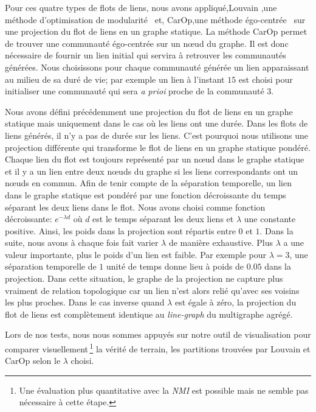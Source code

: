 \bigskip
Pour ces quatre types de flots de liens, nous avons appliqué,Louvain ,une méthode d'optimisation de modularité~\cite{Blondel2008a} et, CarOp,une méthode égo-centrée~\cite{Danisch2012} sur une projection du flot de liens en un graphe statique.
La méthode CarOp permet de trouver une communauté égo-centrée sur un n\oe ud du graphe.
Il est donc nécessaire de fournir un lien initial qui servira à retrouver les communautés générées.
Nous choisissons pour chaque communauté générée un lien apparaissant au milieu de sa duré de vie; par exemple un lien à l'instant $15$ est choisi pour initialiser une communauté qui sera \emph{a prioi} proche de la communauté $3$.


Nous avons défini précédemment une projection du flot de liens en un graphe statique mais uniquement dans le cas où les liens ont une durée.
Dans les flots de liens générés, il n'y a pas de durée sur les liens.
C'est pourquoi nous utilisons une projection différente qui transforme le flot de liens en un graphe statique pondéré.
Chaque lien du flot est toujours représenté par un n\oe ud dans le graphe statique et il y a un lien entre deux n\oe uds du graphe si les liens correspondants ont un n\oe uds en commun.
Afin de tenir compte de la séparation temporelle, un lien dans le graphe statique est pondéré par une fonction décroissante du temps séparant les deux liens dans le flot.
Nous avons choisi comme fonction décroissante: $e^{-\lambda d}$ où $d$ est le temps séparant les deux liens et $\lambda$ une constante positive.
Ainsi, les poids dans la projection sont répartis entre $0$ et $1$.
Dans la suite, nous avons à chaque fois fait varier $\lambda$ de manière exhaustive.
Plus $\lambda$ a une valeur importante, plus le poids d'un lien est faible.
Par exemple pour $\lambda=3$, une séparation temporelle de $1$ unité de temps donne lieu à poids de $0.05$ dans la projection.
Dans cette situation, le graphe de la projection ne capture plus vraiment de relation topologique car un lien n'est alors relié qu'avec ses voisins les plus proches.
Dans le cas inverse quand $\lambda$ est égale à zéro, la projection du flot de liens est complètement identique au \emph{line-graph} du multigraphe agrégé.

Lors de nos tests,  nous nous sommes appuyés sur notre outil de visualisation pour comparer visuellement\,\footnote{Une évaluation plus quantitative avec la \emph{NMI} est possible mais ne semble pas nécessaire à cette étape.} la vérité de terrain, les partitions trouvées par Louvain et CarOp selon le $\lambda$ choisi.

